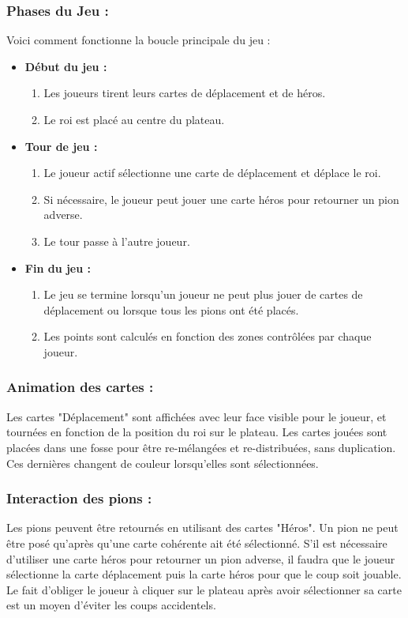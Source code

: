 \subsubsection*{Phases du Jeu :}
Voici comment fonctionne la boucle principale du jeu :
\begin{itemize}
	\item \textbf{Début du jeu :}
	\begin{enumerate}
		\item Les joueurs tirent leurs cartes de déplacement et de héros.
		\item Le roi est placé au centre du plateau.
	\end{enumerate}
	\item \textbf{Tour de jeu :}
	\begin{enumerate}
		\item Le joueur actif sélectionne une carte de déplacement et déplace le roi.
		\item Si nécessaire, le joueur peut jouer une carte héros pour retourner un pion adverse.
		\item Le tour passe à l'autre joueur.
	\end{enumerate}
		\item \textbf{Fin du jeu :}
	\begin{enumerate}
		\item Le jeu se termine lorsqu'un joueur ne peut plus jouer de cartes de déplacement ou lorsque tous les pions ont été placés.
		\item Les points sont calculés en fonction des zones contrôlées par chaque joueur.
	\end{enumerate}
\end{itemize}


\subsubsection*{Animation des cartes :}
Les cartes "Déplacement" sont affichées avec leur face visible pour le joueur, et tournées en fonction de la position du roi sur le plateau. Les cartes jouées sont placées dans une fosse pour être re-mélangées et re-distribuées, sans duplication. Ces dernières changent de couleur lorsqu'elles sont sélectionnées.

\subsubsection*{Interaction des pions :}
Les pions peuvent être retournés en utilisant des cartes "Héros". Un pion ne peut être posé qu'après qu'une carte cohérente ait été sélectionné. S'il est nécessaire d'utiliser une carte héros pour retourner un pion adverse, il faudra que le joueur sélectionne la carte déplacement puis la carte héros pour que le coup soit jouable. Le fait d'obliger le joueur à cliquer sur le plateau après avoir sélectionner sa carte est un moyen d'éviter les coups accidentels.

